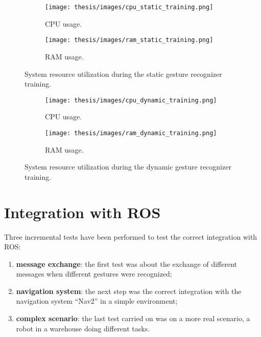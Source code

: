 \documentclass[../thesis.tex]{subfiles}
\begin{document}
\begin{figure}[H]
    \centering
    \begin{subfigure}[b]{0.45\textwidth}
        \centering
        \texttt{[image: thesis/images/cpu\_static\_training.png]}
        \caption{CPU usage.}
        \label{fig:cpu_usage_static_training}
    \end{subfigure}
    \hfill
    \begin{subfigure}[b]{0.45\textwidth}
        \centering
        \texttt{[image: thesis/images/ram\_static\_training.png]}
        \caption{RAM usage.}
        \label{fig:ram_usage_static_training}
    \end{subfigure}
    \caption{System resource utilization during the static gesture recognizer training.}
    \label{fig:system_resource_graphs_static_training}
\end{figure}

\begin{figure}[H]
    \centering
    \begin{subfigure}[b]{0.45\textwidth}
        \centering
        \texttt{[image: thesis/images/cpu\_dynamic\_training.png]}
        \caption{CPU usage.}
        \label{fig:cpu_usage_dynamic_training}
    \end{subfigure}
    \hfill
    \begin{subfigure}[b]{0.45\textwidth}
        \centering
        \texttt{[image: thesis/images/ram\_dynamic\_training.png]}
        \caption{RAM usage.}
        \label{fig:ram_usage_dynamic_training}
    \end{subfigure}
    \caption{System resource utilization during the dynamic gesture recognizer training.}
    \label{fig:system_resource_graphs_dynamic_training}
\end{figure}

\section{Integration with ROS}
Three incremental tests have been performed to test the correct integration with \gls{ROS}:
\begin{enumerate}
    \item \textbf{message exchange}: the first test was about the exchange of different messages when different gestures were recognized;
    \item \textbf{navigation system}: the next step was the correct integration with the navigation system ``Nav2'' in a simple environment;
    \item \textbf{complex scenario}: the last test carried on was on a more real scenario, a robot in a warehouse doing different tasks.
\end{enumerate}
\end{document}
